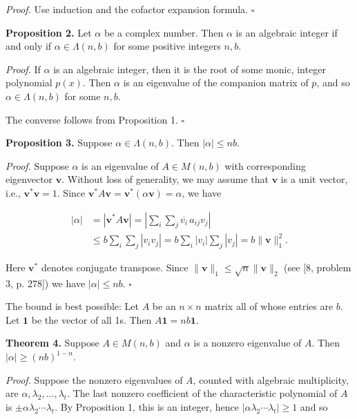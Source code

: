 \documentclass[11pt,letterpaper]{article}
\begin{document}
\noindent\textit{Proof.} Use induction and the cofactor expansion formula. \(\square\)

\noindent\textbf{Proposition 2.} Let $\alpha$ be a complex number. Then $\alpha$ is an algebraic integer if and only if $\alpha \in \Lambda(n, b)$ for some positive integers $n, b$.

\noindent\textit{Proof.} If $\alpha$ is an algebraic integer, then it is the root of some monic, integer polynomial $p(x)$. Then $\alpha$ is an eigenvalue of the companion matrix of $p$, and so $\alpha \in \Lambda(n, b)$ for some $n, b$.

The converse follows from Proposition 1. \(\square\)

\noindent\textbf{Proposition 3.} Suppose $\alpha \in \Lambda(n, b)$. Then $|\alpha| \leq n b$.

\noindent\textit{Proof.} Suppose $\alpha$ is an eigenvalue of $A \in M(n, b)$ with corresponding eigenvector $\mathbf v$. Without loss of generality, we may assume that $\mathbf{v}$ is a unit vector, i.e., $\mathbf v^*\mathbf v=1$. Since $\mathbf v^*A\mathbf v=\mathbf v^*(\alpha\mathbf v)=\alpha$, we have

\[
\begin{aligned}
|\alpha| & =|\mathbf v^*A\mathbf v|=\left|\sum_{i} \sum_{j} \overline{v_i}\,a_{ij}v_j\right| \\
& \leq b \sum_{i} \sum_{j}\left|v_{i} v_{j}\right|=b \sum_{i}\left|v_{i}\right| \sum_{j}\left|v_{j}\right|=b\|\mathbf{v}\|_{1}^{2} .
\end{aligned}
\]

Here $\mathbf v^*$ denotes conjugate transpose. Since $\|\mathbf{v}\|_{1} \leq \sqrt{n}\|\mathbf{v}\|_{2}$ (see [8, problem 3, p. 278]) we have $|\alpha|\leq nb$. \(\square\)

The bound is best possible: Let $A$ be an $n \times n$ matrix all of whose entries are $b$. Let $\mathbf1$ be the vector of all 1s. Then $A \mathbf{1}=n b \mathbf{1}$.

\noindent\textbf{Theorem 4.} Suppose $A \in M(n, b)$ and $\alpha$ is a nonzero eigenvalue of $A$. Then $|\alpha| \geq(n b)^{1-n}$.

\noindent\textit{Proof.} Suppose the nonzero eigenvalues of $A$, counted with algebraic multiplicity, are $\alpha, \lambda_{2}, \ldots, \lambda_{t}$. The last nonzero coefficient of the characteristic polynomial of $A$ is $\pm \alpha \lambda_{2} \cdots \lambda_{t}$. By Proposition 1, this is an integer, hence $\left|\alpha \lambda_{2} \cdots \lambda_{t}\right| \geq 1$ and so
\end{document}
